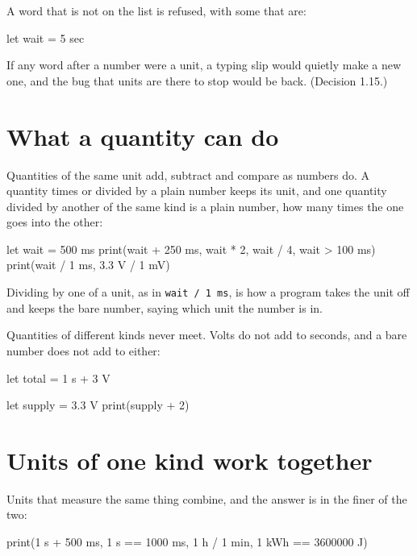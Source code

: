 A word that is not on the list is refused, with some that are:

\begin{zeno}[fails=yes]
let wait = 5 sec
\end{zeno}

\begin{why}
If any word after a number were a unit, a typing slip would quietly
make a new one, and the bug that units are there to stop would be
back. (Decision 1.15.)
\end{why}

\section{What a quantity can do}

Quantities of the same unit add, subtract and compare as numbers do.
A quantity times or divided by a plain number keeps its unit, and one
quantity divided by another of the same kind is a plain number, how
many times the one goes into the other:

\begin{zeno}
let wait = 500 ms
print(wait + 250 ms, wait * 2, wait / 4, wait > 100 ms)
print(wait / 1 ms, 3.3 V / 1 mV)
\end{zeno}

Dividing by one of a unit, as in \verb|wait / 1 ms|, is how a program
takes the unit off and keeps the bare number, saying which unit the
number is in.

Quantities of different kinds never meet. Volts do not add to seconds,
and a bare number does not add to either:

\begin{zeno}[fails=yes]
let total = 1 s + 3 V
\end{zeno}

\begin{zeno}[fails=yes]
let supply = 3.3 V
print(supply + 2)
\end{zeno}

\section{Units of one kind work together}

Units that measure the same thing combine, and the answer is in the
finer of the two:

\begin{zeno}
print(1 s + 500 ms, 1 s == 1000 ms, 1 h / 1 min, 1 kWh == 3600000 J)
\end{zeno}

